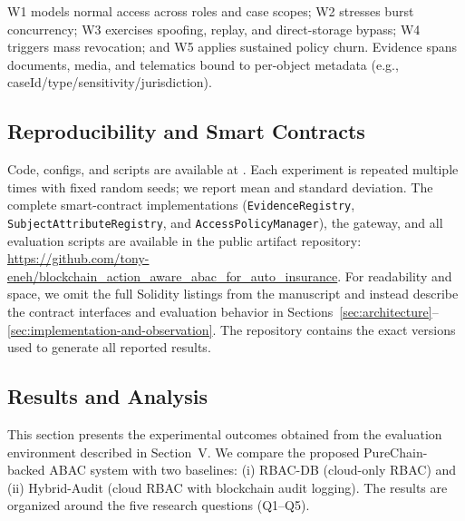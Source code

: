 \documentclass[final,5p,times,twocolumn]{elsarticle}
\begin{document}
W1 models normal access across roles and case scopes; W2 stresses burst concurrency; W3 exercises spoofing, replay, and direct-storage bypass; W4 triggers mass revocation; and W5 applies sustained policy churn. Evidence spans documents, media, and telematics bound to per-object metadata (e.g., caseId/type/sensitivity/jurisdiction).


\subsection{Reproducibility and Smart Contracts}
Code, configs, and scripts are available at \cite{claimguard-repo}. Each experiment is repeated multiple times with fixed random seeds; we report mean and standard deviation. The complete smart-contract implementations (\texttt{EvidenceRegistry}, \texttt{SubjectAttributeRegistry}, and \texttt{AccessPolicyManager}), the gateway, and all evaluation scripts are available in the public artifact repository:
\url{https://github.com/tony-eneh/blockchain_action_aware_abac_for_auto_insurance}.
For readability and space, we omit the full Solidity listings from the manuscript and instead describe the contract interfaces and evaluation behavior in Sections~\ref{sec:architecture}--\ref{sec:implementation-and-observation}. The repository contains the exact versions used to generate all reported results.




\subsection{Results and Analysis}

This section presents the experimental outcomes obtained from the evaluation
environment described in Section~V. We compare the proposed PureChain-backed
ABAC system with two baselines: (i) RBAC-DB (cloud-only RBAC) and
(ii) Hybrid-Audit (cloud RBAC with blockchain audit logging). The results are
organized around the five research questions (Q1--Q5).
\end{document}
